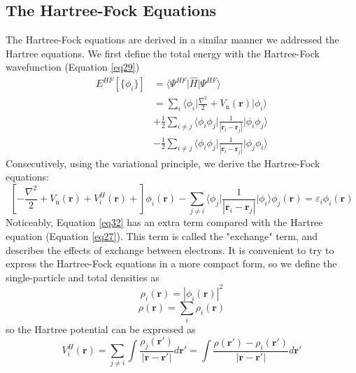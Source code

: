 \subsection{The Hartree-Fock Equations}
The Hartree-Fock equations are derived in a similar manner we addressed the Hartree equations. We first define the total energy with the Hartree-Fock wavefunction (Equation \ref{eq29}) 
\begin{equation}
  \label{eq31}
  \begin{split}
    E^{HF}[\{\phi_i\}] &= \bigg\langle \Psi^{HF} \bigg| \hat{H} \bigg| \Psi^{HF} \bigg\rangle\\
    &= \sum_{i} \langle \phi_i \big|\frac{\nabla^2}{2} + V_{\text{n}}(\mathbf{r})\big| \phi_i \rangle\\
    &+ \frac{1}{2} \sum_{i\neq j} \langle \phi_i \phi_j \big| \frac{1}{|\mathbf{r}_i - \mathbf{r}_j|} \big| \phi_i \phi_j\rangle\\
    &- \frac{1}{2} \sum_{i\neq j} \langle \phi_i \phi_j \big| \frac{1}{|\mathbf{r}_i - \mathbf{r}_j|} \big| \phi_j \phi_i\rangle
  \end{split}
\end{equation}
Consecutively, using the variational principle, we derive the Hartree-Fock equations: 
\begin{equation}
  \label{eq32}
  \left[-\frac{\nabla^2}{2} + V_{\text{n}}(\mathbf{r}) + V^H_i(\mathbf{r}) +\right]\phi_i(\mathbf{r})
  - \sum_{j\neq i} \langle \phi_j \big| \frac{1}{|\mathbf{r}_i - \mathbf{r}_j|} \big| \phi_i \rangle \phi_j(\mathbf{r})
  = \varepsilon_i \phi_i(\mathbf{r})
\end{equation}
Noticeably, Equation \ref{eq32} has an extra term compared with the Hartree equation (Equation \ref{eq27}). This term is called the "exchange" term\supercite{kaxiras2003atomic}, and describes the effects of exchange between electrons. It is convenient to try to express the Hartree-Fock equations in a more compact form, so we define the single-particle and total densities as 
\begin{equation}
  \label{eq33}
  \rho_i(\mathbf{r}) = |\phi_i(\mathbf{r})|^2
\end{equation}
\begin{equation}
  \label{eq34}
  \rho(\mathbf{r}) = \sum_i \rho_i(\mathbf{r}) 
\end{equation}
so the Hartree potential can be expressed as 
\begin{equation}
  \label{eq35}
  V^H_i(\mathbf{r}) = \sum_{j\neq i}  \int \frac{\rho_j(\mathbf{r'})}{|\mathbf{r} - \mathbf{r'}|} d\mathbf{r'} 
  = \int \frac{\rho(\mathbf{r'}) - \rho_i(\mathbf{r'})}{|\mathbf{r} - \mathbf{r'}|} d\mathbf{r'}
\end{equation}
